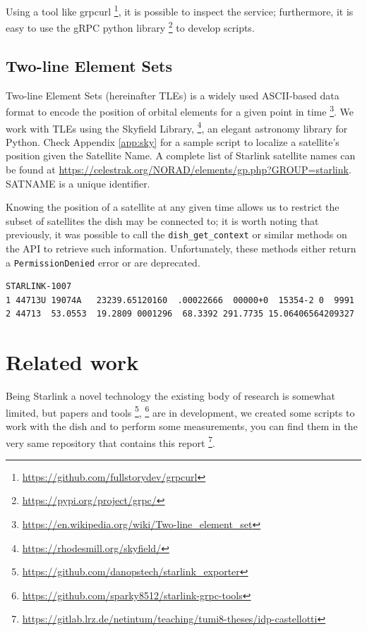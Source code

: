 \documentclass[IN,11pt,twoside,openright,idp,english]{tumthesis}
\begin{document}
Using a tool like grpcurl \footnote{\url{https://github.com/fullstorydev/grpcurl}}, it is possible to inspect the service; furthermore, it is easy to use the gRPC python library \footnote{\url{https://pypi.org/project/grpc/}} to develop scripts.
    
\subsection{Two-line Element Sets}
    
Two-line Element Sets (hereinafter TLEs) is a widely used ASCII-based data format to encode the position of orbital elements for a given point in time \footnote{\url{https://en.wikipedia.org/wiki/Two-line_element_set}}. We work with TLEs using the Skyfield Library, \footnote{\url{https://rhodesmill.org/skyfield/}}, an elegant astronomy library for Python. Check Appendix \ref{app:sky} for a sample script to localize a satellite's position given the Satellite Name. A complete list of Starlink satellite names can be found at \url{https://celestrak.org/NORAD/elements/gp.php?GROUP=starlink}. 
SATNAME is a unique identifier.
    
Knowing the position of a satellite at any given time allows us to restrict the subset of satellites the dish may be connected to; it is worth noting that previously, it was possible to call the \texttt{dish\_get\_context} or similar methods on the API to retrieve such information. Unfortunately, these methods either return a \texttt{PermissionDenied} error or are deprecated.
    
\begin{lstlisting}[caption={TLE for satellite STARLINK-1007 },captionpos=b]
STARLINK-1007           
1 44713U 19074A   23239.65120160  .00022666  00000+0  15354-2 0  9991
2 44713  53.0553  19.2809 0001296  68.3392 291.7735 15.06406564209327
\end{lstlisting}
    
\section{Related work}
    
Being Starlink a novel technology the existing body of research is somewhat limited, but papers and tools \footnote{\url{https://github.com/danopstech/starlink\_exporter}}, \footnote{\url{https://github.com/sparky8512/starlink-grpc-tools}} are in development, we created some scripts to work with the dish and to perform some measurements, you can find them in the very same repository that contains this report \footnote{\url{https://gitlab.lrz.de/netintum/teaching/tumi8-theses/idp-castellotti}}.
    
\end{document}
